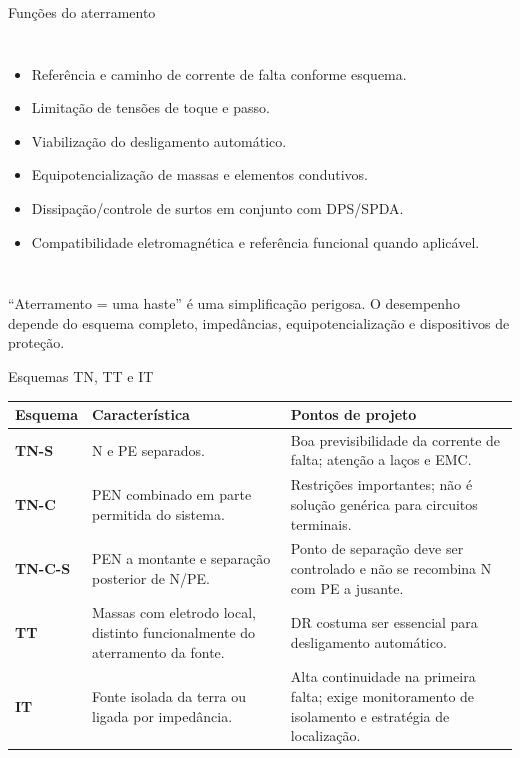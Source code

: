 \begin{frame}[shrink=2]{Funções do aterramento}
\small
\begin{columns}[T,onlytextwidth]
\begin{itemize}
\item Referência e caminho de corrente de falta conforme esquema.
\item Limitação de tensões de toque e passo.
\item Viabilização do desligamento automático.
\item Equipotencialização de massas e elementos condutivos.
\item Dissipação/controle de surtos em conjunto com DPS/SPDA.
\item Compatibilidade eletromagnética e referência funcional quando aplicável.
\end{itemize}
\centering
{}
\end{columns}
\begin{caixaAt}
``Aterramento = uma haste'' é uma simplificação perigosa. O desempenho depende do esquema completo, impedâncias, equipotencialização e dispositivos de proteção.
\end{caixaAt}
\end{frame}

\begin{frame}{Esquemas TN, TT e IT}
\scriptsize
\begin{tabularx}{\textwidth}{>{\bfseries}p{1.5cm}p{3.5cm}X}
\toprule
Esquema & Característica & Pontos de projeto \\
\midrule
TN-S & N e PE separados. & Boa previsibilidade da corrente de falta; atenção a laços e EMC. \\
TN-C & PEN combinado em parte permitida do sistema. & Restrições importantes; não é solução genérica para circuitos terminais. \\
TN-C-S & PEN a montante e separação posterior de N/PE. & Ponto de separação deve ser controlado e não se recombina N com PE a jusante. \\
TT & Massas com eletrodo local, distinto funcionalmente do aterramento da fonte. & DR costuma ser essencial para desligamento automático. \\
IT & Fonte isolada da terra ou ligada por impedância. & Alta continuidade na primeira falta; exige monitoramento de isolamento e estratégia de localização. \\
\bottomrule
\end{tabularx}
\end{frame}

